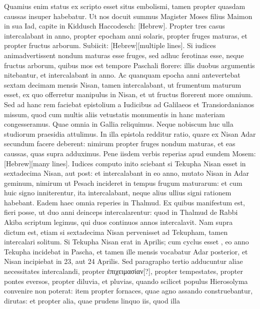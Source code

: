%
Quamius enim status ex scripto esset situs embolismi,
 tamen propter
quasdam caussas insuper habebatur.
Ut nos docuit summus Magister
Moses filius Maimon in sua Iad, capite in Kiddusch Haccodesch:
\texthebrew{[Hebrew]}.
Propter
tres casus intercalabant in anno, propter epocham anni solaris,
propter fruges maturas, et propter fructus arborum.
Subiicit:
\texthebrew{[Hebrew][multiple lines]}.
Si iudices animadvertissent nondum
maturas esse fruges, sed adhuc ferotinas esse, neque fructus arborum,
quibus mos est tempore Paschali florere: illis duobus argumentis nitebantur,
et intercalabant in anno.
Ac quanquam epocha anni antevertebat
sextam decimam mensis Nisan, tamen intercalabant, ut
frumentum maturum esset, ex quo offerretur manipulus in 
Nisan, et ut fructus florerent more omnium.
Sed ad hanc rem
faciebat epistolium a Iudicibus ad Galilaeos et Transiordanianos
missum, quod cum multis aliis vetustatis monumentis in hanc materiam
congesseramus.
Quae omnia in Gallia reliquimus.
Neque nobiscum
huc ulla studiorum praesidia attulimus.
In illa epistola redditur
ratio, quare ex Nisan Adar secundum facere deberent: nimirum propter
fruges nondum maturas, et eas caussas, quas supra adduximus.
Pene iisdem verbis reperias apud eundem Mosem:
 \texthebrew{[Hebrew][many lines]}.
Iudices computo inito sciebant si Tekupha Nisan esset in sextadecima
Nisan, aut post: et intercalabant in eo anno, mutato Nisan in
Adar geminum, nimirum ut Pesach incideret in tempus frugum maturarum:
et cum huic signo inniterentur, ita intercalabant, neque
alius ullius signi rationem habebant.
Eadem haec omnia reperies in
Thalmud.
Ex quibus manifestum est, fieri posse, ut duo anni deinceps
intercalarentur: quod in Thalmud de Rabbi Akiba scriptum legimus,
qui duos continuos annos intercalavit.
Nam supra dictum est,
etiam si sextadecima Nisan pervenisset ad Tekupham, tamen intercalari
solitum.
Si Tekupha Nisan erat in  Aprilis; cum cyclus esset
, eo anno Tekupha incidebat in Pascha, et tamen ille mensis
vocabatur Adar posterior, et Nisan incipiebat in 23, aut 24 Aprilis.
Sed paragrapho tertio adducuntur aliae necessitates intercalandi,
propter \textgreek{ἐπιχειμασίαν[?]}, propter tempestates, propter pontes eversos,
propter diluvia, et pluvias, quando scilicet populus Hierosolyma
convenire non poterat: item propter fornaces, quae agno assando construebantur,
dirutas: et propter alia, quae prudens linquo iis, quod illa
